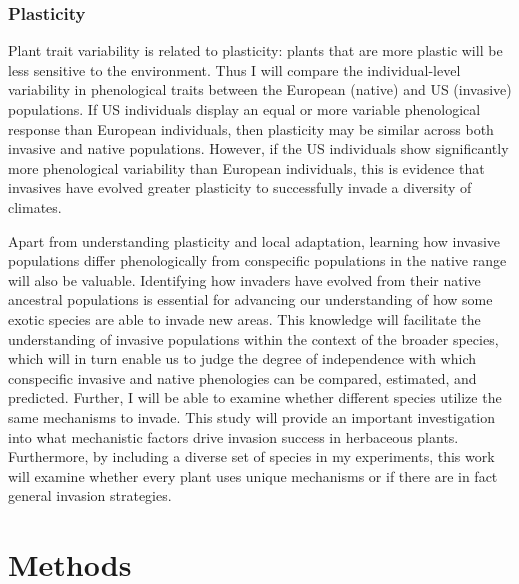 \documentclass[12pt]{article}\usepackage[]{graphicx}\usepackage[]{color}
\begin{document}
	\subsubsection{Plasticity} 
	Plant trait variability is related to plasticity: plants that are more plastic will be less sensitive to the environment. Thus I will compare the individual-level variability in phenological traits between the European (native) and US (invasive) populations. If US individuals display an equal or more variable phenological response than European individuals, then plasticity may be similar across both invasive and native populations.  However, if the US individuals show significantly more phenological variability than European individuals, this is evidence that invasives have evolved greater plasticity to successfully invade a diversity of climates. 
	
	Apart from understanding plasticity and local adaptation, learning how invasive populations differ phenologically from conspecific populations in the native range will also be valuable. Identifying how invaders have evolved from their native ancestral populations is essential for advancing our understanding of how some exotic species are able to invade new areas. This knowledge will facilitate the understanding of invasive populations within the context of the broader species, which will in turn enable us to judge the degree of independence with which conspecific invasive and native phenologies can be compared, estimated, and predicted. Further, I will be able to examine whether different species utilize the same mechanisms to invade. This study will provide an important investigation into what mechanistic factors drive invasion success in herbaceous plants. Furthermore, by including a diverse set of species in my experiments, this work will examine whether every plant uses unique mechanisms or if there are in fact general invasion strategies. 
	
	\section{Methods}
\end{document}
